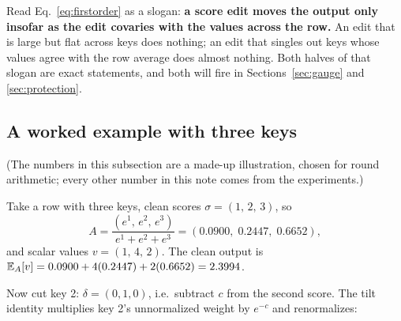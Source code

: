 \documentclass{article}
\begin{document}
\begin{center}
\end{center}

Read Eq.~\eqref{eq:firstorder} as a slogan: \textbf{a score edit moves the output only insofar as the edit covaries with the values across the row.} An edit that is large but flat across keys does nothing; an edit that singles out keys whose values agree with the row average does almost nothing. Both halves of that slogan are exact statements, and both will fire in Sections~\ref{sec:gauge} and \ref{sec:protection}.

\subsection{A worked example with three keys}\label{sec:worked}

(The numbers in this subsection are a made-up illustration, chosen for round arithmetic; every other number in this note comes from the experiments.)

Take a row with three keys, clean scores $\sigma = (1,\, 2,\, 3)$, so
\begin{equation*}
    A = \frac{(e^1,\, e^2,\, e^3)}{e^1 + e^2 + e^3} = (0.0900,\; 0.2447,\; 0.6652),
\end{equation*}
and scalar values $v = (1,\, 4,\, 2)$. The clean output is $\mathbb{E}_A[v] = 0.0900 + 4(0.2447) + 2(0.6652) = 2.3994$.

Now cut key 2: $\delta = (0, 1, 0)$, i.e.\ subtract $c$ from the second score. The tilt identity multiplies key 2's unnormalized weight by $e^{-c}$ and renormalizes:
\end{document}
